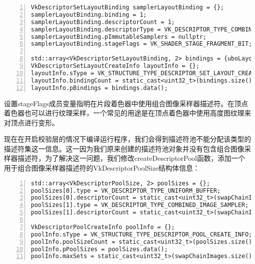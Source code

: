 \documentclass{ctexart}
\begin{document}
\begin{lstlisting}[language={[ANSI]C},keywordstyle=\color{blue!70},commentstyle=\color{red!50!green!50!blue!50},frame=shadowbox, rulesepcolor=\color{red!20!green!20!blue!20},basicstyle=\small,numbers=left, numberstyle=\tiny,breaklines=true]
VkDescriptorSetLayoutBinding samplerLayoutBinding = {};
samplerLayoutBinding.binding = 1;
samplerLayoutBinding.descriptorCount = 1;
samplerLayoutBinding.descriptorType = VK_DESCRIPTOR_TYPE_COMBINED_IMAGE_SAMPLER;
samplerLayoutBinding.pImmutableSamplers = nullptr;
samplerLayoutBinding.stageFlags = VK_SHADER_STAGE_FRAGMENT_BIT;

std::array<VkDescriptorSetLayoutBinding, 2> bindings = {uboLayoutBinding, samplerLayoutBinding};
VkDescriptorSetLayoutCreateInfo layoutInfo = {};
layoutInfo.sType = VK_STRUCTURE_TYPE_DESCRIPTOR_SET_LAYOUT_CREATE_INFO;
layoutInfo.bindingCount = static_cast<uint32_t>(bindings.size());
layoutInfo.pBindings = bindings.data();
\end{lstlisting}

设置stageFlags成员变量指明在片段着色器中使用组合图像采样器描述符。在顶点着色器也可以进行纹理采样，一个常见的用途是在顶点着色器中使用高度图纹理来对顶点进行变形。

现在在开启校验层的情况下编译运行程序，我们会得到描述符池不能分配该类型的描述符集这一信息。这一因为我们原来创建的描述符池对象并没有包含组合图像采样器描述符，为了解决这一问题，我们修改createDescriptorPool函数，添加一个用于组合图像采样器描述符的VkDescriptorPoolSize结构体信息：

\begin{lstlisting}[language={[ANSI]C},keywordstyle=\color{blue!70},commentstyle=\color{red!50!green!50!blue!50},frame=shadowbox, rulesepcolor=\color{red!20!green!20!blue!20},basicstyle=\small,numbers=left, numberstyle=\tiny,breaklines=true]
std::array<VkDescriptorPoolSize, 2> poolSizes = {};
poolSizes[0].type = VK_DESCRIPTOR_TYPE_UNIFORM_BUFFER;
poolSizes[0].descriptorCount = static_cast<uint32_t>(swapChainImages.size());
poolSizes[1].type = VK_DESCRIPTOR_TYPE_COMBINED_IMAGE_SAMPLER;
poolSizes[1].descriptorCount = static_cast<uint32_t>(swapChainImages.size());

VkDescriptorPoolCreateInfo poolInfo = {};
poolInfo.sType = VK_STRUCTURE_TYPE_DESCRIPTOR_POOL_CREATE_INFO;
poolInfo.poolSizeCount = static_cast<uint32_t>(poolSizes.size());
poolInfo.pPoolSizes = poolSizes.data();
poolInfo.maxSets = static_cast<uint32_t>(swapChainImages.size());
\end{lstlisting}
\end{document}
